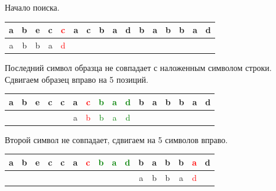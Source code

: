 \documentclass[a4paper,14pt]{report}
\begin{document}
Начало поиска.

\begin{table}[!h]
		\begin{tabular}{| c | c | c | c | c | c | c | c | c | c | c | c | c | c | c | c |}
	 	\hline
		a & b & e & c &  \textcolor{red}{c} & a & c & b & a & d & b & a & b & b & a & d \\ \hline
    a & b & b & a &  \textcolor{red}{d} & & & & & & & & & & & \\ \hline
		\end{tabular}
\end{table}

Последний символ образца не совпадает с наложенным символом строки. Сдвигаем образец вправо на 5 позиций.
\newpage

\begin{table}[h]
		\begin{tabular}{| c | c | c | c | c | c | c | c | c | c | c | c | c | c | c | c |}
	 	\hline
		a & b & e & c & c & a & \textcolor{red}{c} & \textcolor{green}{b} & \textcolor{green}{a} & \textcolor{green}{d} & b & a & b & b & a & d \\ \hline
     &  &  &  & & a & \textcolor{red}{b} & \textcolor{green}{b} & \textcolor{green}{a} & \textcolor{green}{d} & & & & & & \\ \hline
		\end{tabular}
\end{table}

Второй символ не совпадает, сдвигаем на 5 символов вправо.

\begin{table}[h]
		\begin{tabular}{| c | c | c | c | c | c | c | c | c | c | c | c | c | c | c | c |}
	 	\hline
		a & b & e & c & c & a & \textcolor{red}{c} & \textcolor{green}{b} & \textcolor{green}{a} & \textcolor{green}{d} & b & a & b & b & \textcolor{red}{a} & d \\ \hline
     &  &  &  &  &  &  &  &  &  & a & b & b & a & \textcolor{red}{d} & \\ \hline
		\end{tabular}
\end{table}
\end{document}
